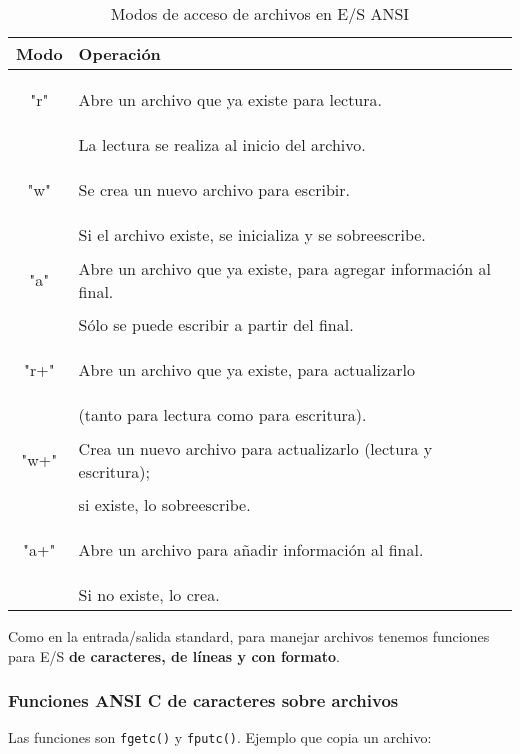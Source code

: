 \begin{table}[hbtp]
\centering
\begin{tabular}{c|l}
Modo & Operación \\
\hline
\begin{codecell}
"r"
\end{codecell} & Abre un archivo que ya existe para lectura. \\
				& La lectura se realiza al inicio del archivo.\\
\hline
\begin{codecell}
"w"
\end{codecell} & Se crea un nuevo archivo para escribir. \\
				& Si el archivo existe, se inicializa y se sobreescribe.\\
\hline
\begin{codecell}
"a" 
\end{codecell}& Abre un archivo que ya existe, para agregar información al final.\\ 
				& Sólo se puede escribir a partir del final.\\
\hline
\begin{codecell}
"r+"
\end{codecell}& Abre un archivo que ya existe, para actualizarlo \\
				& (tanto para lectura como para escritura).\\
\hline
\begin{codecell}
"w+"
\end{codecell}& Crea un nuevo archivo para actualizarlo (lectura y escritura); \\
				& si existe, lo sobreescribe.\\
\hline
\begin{codecell}
"a+"
\end{codecell}& Abre un archivo para añadir información al final. \\
				& Si no existe, lo crea.\\
\end{tabular}
\caption{Modos de acceso de archivos en E/S ANSI}
\label{tab:modos}
\end{table}

Como en la entrada/salida standard, para manejar archivos tenemos funciones
para E/S \textbf{de caracteres, de líneas y con formato}.

\subsubsection{Funciones ANSI C de caracteres sobre archivos}
\label{subsubsec:esarchivosansiccaract}
Las funciones son \lstinline{fgetc()} y \lstinline{fputc()}. Ejemplo que copia un archivo:

